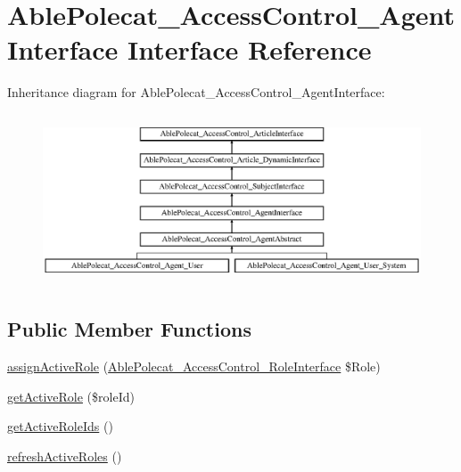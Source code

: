 \hypertarget{interface_able_polecat___access_control___agent_interface}{}\section{Able\+Polecat\+\_\+\+Access\+Control\+\_\+\+Agent\+Interface Interface Reference}
\label{interface_able_polecat___access_control___agent_interface}
Inheritance diagram for Able\+Polecat\+\_\+\+Access\+Control\+\_\+\+Agent\+Interface\+:\begin{figure}[H]
\begin{center}
\leavevmode
\includegraphics[height=5.121951cm]{interface_able_polecat___access_control___agent_interface}
\end{center}
\end{figure}
\subsection*{Public Member Functions}
\begin{DoxyCompactItemize}
\item 
\hyperlink{interface_able_polecat___access_control___agent_interface_aa20eaa314f35da6155b74a1f631393b8}{assign\+Active\+Role} (\hyperlink{interface_able_polecat___access_control___role_interface}{Able\+Polecat\+\_\+\+Access\+Control\+\_\+\+Role\+Interface} \$Role)
\item 
\hyperlink{interface_able_polecat___access_control___agent_interface_a368167873f151dd37d88e11f6a5f10ad}{get\+Active\+Role} (\$role\+Id)
\item 
\hyperlink{interface_able_polecat___access_control___agent_interface_a8db7ea97d01a0687141844be9a76f250}{get\+Active\+Role\+Ids} ()
\item 
\hyperlink{interface_able_polecat___access_control___agent_interface_af655f2dcc765ece1fcd66a407d53c4cb}{refresh\+Active\+Roles} ()
\end{DoxyCompactItemize}
